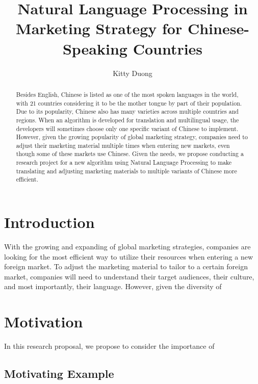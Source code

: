 \documentclass[sigconf]{acmart}
\begin{document}
\title{Natural Language Processing in Marketing Strategy for Chinese-Speaking Countries}
\author{Kitty Duong}

\begin{abstract}
Besides English, Chinese is listed as one of the most spoken languages in the world, with 21 countries considering it to be the mother tongue by part of their population. Due to its popularity, Chinese also has many varieties across multiple countries and regions. When an algorithm is developed for translation and multilingual usage, the developers will sometimes choose only one specific variant of Chinese to implement. However, given the growing popularity of global marketing strategy, companies need to adjust their marketing material multiple times when entering new markets, even though some of these markets use Chinese. Given the needs, we propose conducting a research project for a new algorithm using Natural Language Processing to make translating and adjusting marketing materials to multiple variants of Chinese more efficient.
\end{abstract}

\maketitle

\section{Introduction}
With the growing and expanding of global marketing strategies, companies are looking for the most efficient way to utilize their resources when entering a new foreign market. To adjust the marketing material to tailor to a certain foreign market, companies will need to understand their target audiences, their culture, and most importantly, their language. However, given the diversity of 

\section{Motivation}
In this research proposal, we propose to consider the importance of 

\subsection{Motivating Example}
\end{document}
